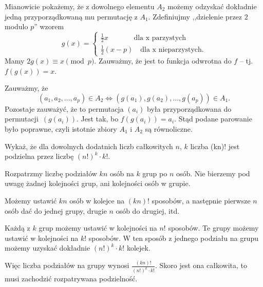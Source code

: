 \noindent
Mianowicie pokażemy, że z dowolnego elementu $A_2$ możemy odzyskać dokładnie jedną przyporządkowaną mu permutację z $A_1$. Zdefiniujmy ,,dzielenie przez $2$ modulo $p$'' wzorem
\[
	g(x) = 
	\begin{cases}
	\frac{1}{2}x \;\; \quad\quad\quad\text{dla x parzystych}\\
	\frac{1}{2}(x - p) \quad \text{dla x nieparzystych}.
	\end{cases}
\]
Mamy $2g(x) \equiv x \pmod{p}$.
Zauważmy, że jest to funkcja odwrotna do $f$ -- tj. $f(g(x)) = x$.
\vspace{10px}

\noindent
Zauważmy, że
\[
	(a_1, a_2, ..., a_p) \in A_2 \iff (g(a_1), g(a_2), ..., g(a_p)) \in A_1.
\] 
Pozostaje zauważyć, że to permutacja $(a_i)$ była przyporządkowana do permutacji~$(g(a_i))$. Jest tak, bo $f(g(a_i)) = a_i$. Stąd podane parowanie było poprawne, czyli istotnie zbiory $A_1$ i $A_2$ są równoliczne.
\vspace{10px}


\vspace{5px}

\begin{problem}{5}
	Wykaż, że dla dowolnych dodatnich liczb całkowitych $n$, $k$ liczba	(kn)!
	jest podzielna przez liczbę $(n!)^k \cdot k!$.
\end{problem}

\vspace{5px}

\noindent
Rozpatrzmy liczbę podziałów $kn$ osób na $k$ grup po $n$ osób. Nie bierzemy pod uwagę żadnej kolejności grup, ani kolejności osób w grupie. 

Możemy ustawić $kn$ osób w kolejce na $(kn)!$ sposobów, a następnie pierwsze $n$ osób dać do jednej grupy, drugie $n$ osób do drugiej, itd. 

Każdą z $k$ grup możemy ustawić w kolejności na $n!$ sposobów. Te grupy możemy ustawić w kolejności na $k!$ sposobów. W ten sposób z jednego podziału na grupu możemy uzyskać dokładnie $(n!)^k \cdot k!$ kolejek. 

Więc liczba podziałów na grupy wynosi $\frac{(kn)!}{(n!)^k \cdot k!}$. Skoro jest ona całkowita, to musi zachodzić rozpatrywana podzielność.

\vspace{5px}



